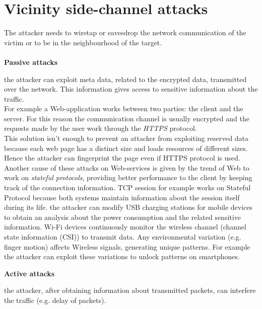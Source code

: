 \section{Vicinity side-channel attacks}
The attacker needs to wiretap or eavesdrop the network communication of the victim or to be in the neighbourhood of the target.\\\\
\textbf{Passive attacks}
\begin{itemize}
{the attacker can exploit meta data, related to the encrypted data, transmitted over the network. This information gives access to sensitive information about the traffic.\\
For example a Web-application works between two parties: the client and the server. For this reason the communication channel is usually encrypted and the requests made by the user work through the \textit{HTTPS} protocol.\\
This solution isn't enough to prevent an attacker from exploiting reserved data because each web page has a distinct size and loads resources of different sizes. Hence the attacker can fingerprint the page even if HTTPS protocol is used.\\
Another cause of these attacks on Web-services is given by the trend of Web to work on \textit{stateful protocols}, providing better performance to the client by keeping track of the connection information. TCP session for example works on Stateful Protocol because both systems maintain information about the session itself during its life\cite{side_leaks}.}
{the attacker can modify USB charging stations for mobile devices to obtain an analysis about the power consumption and the related sensitive information.}
{Wi-Fi devices continuously monitor the wireless channel (channel state information (CSI)) to transmit data. Any environmental variation (e.g. finger motion) affects Wireless signals, generating unique patterns. For example the attacker can exploit these variations to unlock patterns on smartphones\cite{side_CSI}.}
\end{itemize}
\textbf{Active attacks}
\begin{itemize}
{the attacker, after obtaining information about transmitted packets, can interfere the traffic (e.g. delay of packets).}
\end{itemize}


